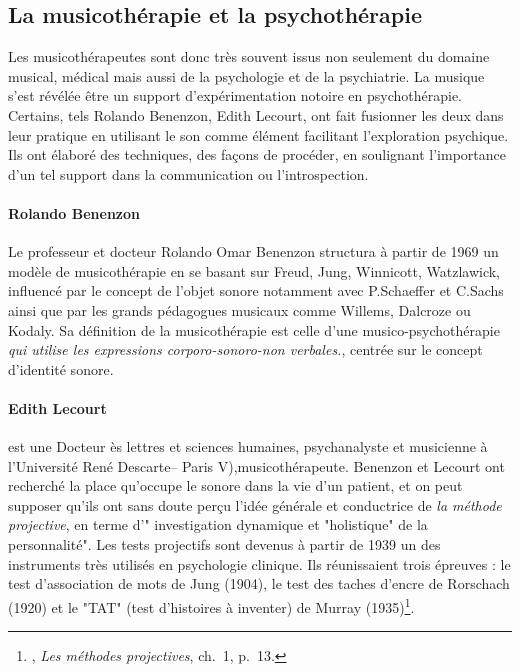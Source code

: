  
 
 
\subsection{La musicothérapie et la psychothérapie}
	 Les musicothérapeutes sont donc très souvent  issus non seulement du domaine musical, médical mais aussi  de  la psychologie et de la psychiatrie. La musique s'est révélée être  un support d'expérimentation notoire en psychothérapie. Certains, tels Rolando Benenzon, Edith Lecourt,  ont fait fusionner les deux dans leur pratique  en utilisant le son comme élément facilitant l'exploration psychique. Ils ont élaboré des techniques, des façons de procéder, en soulignant l'importance d'un tel support dans la  communication ou l'introspection. \paragraph{Rolando Benenzon} Le professeur et docteur Rolando Omar Benenzon structura à partir de 1969 un modèle de musicothérapie en se basant sur Freud, Jung, Winnicott, Watzlawick, influencé par le concept de l'objet sonore notamment avec P.Schaeffer et C.Sachs ainsi que par les grands pédagogues musicaux comme Willems, Dalcroze ou Kodaly. Sa définition de la musicothérapie est celle d'une musico-psychothérapie  \emph{\textsl{qui utilise les expressions corporo-sonoro-non verbales.}}, centrée sur le concept d'identité sonore.

        \paragraph*{Edith Lecourt} est une Docteur ès lettres et sciences humaines, psychanalyste et musicienne à l'Université René Descarte-- Paris V),musicothérapeute.
        Benenzon et Lecourt ont  recherché la place qu'occupe le sonore dans la vie d'un patient, et on peut supposer qu'ils ont sans doute perçu l'idée générale et conductrice de \textsl{la méthode projective}, en terme 
	d'" investigation dynamique et "holistique" de la
        personnalité". Les tests projectifs sont devenus à partir
        de 1939 un des instruments très utilisés en psychologie
        clinique. Ils réunissaient trois épreuves : le test
        d'association de mots de Jung (1904), le test des taches
        d'encre de Rorschach (1920) et le "TAT" (test d'histoires à
        inventer) de Murray (1935)\footnote{\cite{ChabertAnzieu}, \emph{Les méthodes projectives}, ch.~1, p.~13.}.
		

